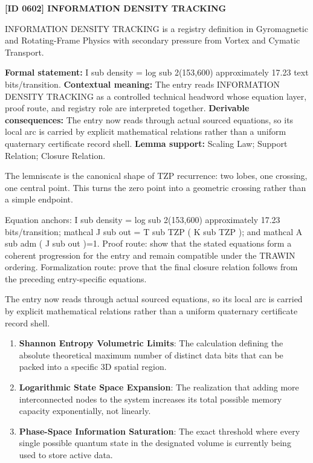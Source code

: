 \clearpage
\noindent\textbf{[ID 0602] INFORMATION DENSITY TRACKING}\par
\vspace{0.35em}
\begingroup\small
{}
INFORMATION DENSITY TRACKING is a registry definition in Gyromagnetic and Rotating-Frame Physics with secondary pressure from Vortex and Cymatic Transport.

\begingroup\footnotesize\setlength{\emergencystretch}{3em}\sloppy
\textbf{Formal statement:} I sub density = log sub 2(153,600) approximately 17.23 text bits/transition. \textbf{Contextual meaning:} The entry reads INFORMATION DENSITY TRACKING as a controlled technical headword whose equation layer, proof route, and registry role are interpreted together. \textbf{Derivable consequences:} The entry now reads through actual sourced equations, so its local arc is carried by explicit mathematical relations rather than a uniform quaternary certificate record shell. \textbf{Lemma support:} Scaling Law; Support Relation; Closure Relation.\par
\endgroup

The lemniscate is the canonical shape of TZP recurrence: two lobes, one crossing, one central point. This turns the zero point into a geometric crossing rather than a simple endpoint.

Equation anchors: I sub density = log sub 2(153,600) approximately 17.23 bits/transition; mathcal J sub out = T sub TZP ( K sub TZP ); and mathcal A sub adm ( J sub out )=1. Proof route: show that the stated equations form a coherent progression for the entry and remain compatible under the TRAWIN ordering. Formalization route: prove that the final closure relation follows from the preceding entry-specific equations.

The entry now reads through actual sourced equations, so its local arc is carried by explicit mathematical relations rather than a uniform quaternary certificate record shell.
\endgroup

\begin{enumerate}[leftmargin=1.6em,itemsep=6pt,topsep=4pt]
\item \textbf{Shannon Entropy Volumetric Limits}: The calculation defining the absolute theoretical maximum number of distinct data bits that can be packed into a specific 3D spatial region.
\item \textbf{Logarithmic State Space Expansion}: The realization that adding more interconnected nodes to the system increases its total possible memory capacity exponentially, not linearly.
\item \textbf{Phase-Space Information Saturation}: The exact threshold where every single possible quantum state in the designated volume is currently being used to store active data.
\end{enumerate}

